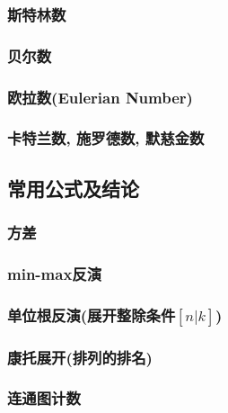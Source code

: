 \documentclass[a4paper, twoside]{article}
\begin{document}
\begin{multicols}{2}
				\subsubsection{斯特林数}
					
				
				\subsubsection{贝尔数}
					
				
				\subsubsection{欧拉数(Eulerian Number)}
					
				
				\subsubsection{卡特兰数, 施罗德数, 默慈金数}
					\label{catalan}
					
			
			\subsection{常用公式及结论}
				\subsubsection{方差}
					
				
				\subsubsection{min-max反演}
					
				
				\subsubsection{单位根反演(展开整除条件$[n|k]$)}
					
				
				\subsubsection{康托展开(排列的排名)}
					
				
				\subsubsection{连通图计数}
					


\end{multicols}
\end{document}
